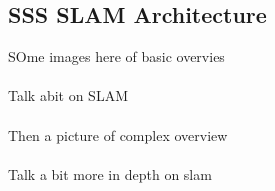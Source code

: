 \subsection{\gls{SSS SLAM} Architecture}
SOme images here of basic overvies
\\ \\
Talk abit on SLAM
\\ \\
Then a picture of complex overview
\\ \\
Talk a bit more in depth on slam